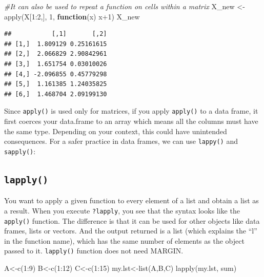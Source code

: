 \documentclass[
]{book}
\newenvironment{Shaded}{\begin{snugshade}}{\end{snugshade}}
\newcommand{\CommentTok}[1]{\textcolor[rgb]{0.56,0.35,0.01}{\textit{#1}}}
\newcommand{\ControlFlowTok}[1]{\textcolor[rgb]{0.13,0.29,0.53}{\textbf{#1}}}
\newcommand{\DecValTok}[1]{\textcolor[rgb]{0.00,0.00,0.81}{#1}}
\newcommand{\FunctionTok}[1]{\textcolor[rgb]{0.00,0.00,0.00}{#1}}
\newcommand{\NormalTok}[1]{#1}
\newcommand{\OtherTok}[1]{\textcolor[rgb]{0.56,0.35,0.01}{#1}}
\newcommand{\SpecialCharTok}[1]{\textcolor[rgb]{0.00,0.00,0.00}{#1}}
\begin{document}
\begin{Shaded}
\begin{Highlighting}[]
\CommentTok{\#It can also be used to repeat a function on cells within a matrix}
\NormalTok{X\_new }\OtherTok{\textless{}{-}} \FunctionTok{apply}\NormalTok{(X[}\DecValTok{1}\SpecialCharTok{:}\DecValTok{2}\NormalTok{,], }\DecValTok{1}\NormalTok{, }\ControlFlowTok{function}\NormalTok{(x) x}\SpecialCharTok{+}\DecValTok{1}\NormalTok{)}
\NormalTok{X\_new}
\end{Highlighting}
\end{Shaded}

\begin{verbatim}
##           [,1]       [,2]
## [1,]  1.809129 0.25161615
## [2,]  2.066829 2.90842961
## [3,]  1.651754 0.03010026
## [4,] -2.096855 0.45779298
## [5,]  1.161385 1.24035825
## [6,]  1.468704 2.09199130
\end{verbatim}

Since \texttt{apply()} is used only for matrices, if you apply \texttt{apply()} to a data frame, it first coerces your data.frame to an array which means all the columns must have the same type. Depending on your context, this could have unintended consequences. For a safer practice in data frames, we can use \texttt{lappy()} and \texttt{sapply()}:

\hypertarget{lapply}{%
\subsection{\texorpdfstring{\texttt{lapply()}}{lapply()}}\label{lapply}}

You want to apply a given function to every element of a list and obtain a list as a result. When you execute \texttt{?lapply}, you see that the syntax looks like the \texttt{apply()} function. The difference is that it can be used for other objects like data frames, lists or vectors. And the output returned is a list (which explains the ``l'' in the function name), which has the same number of elements as the object passed to it. \texttt{lapply()} function does not need MARGIN.

\begin{Shaded}
\begin{Highlighting}[]
\NormalTok{A}\OtherTok{\textless{}{-}}\FunctionTok{c}\NormalTok{(}\DecValTok{1}\SpecialCharTok{:}\DecValTok{9}\NormalTok{)}
\NormalTok{B}\OtherTok{\textless{}{-}}\FunctionTok{c}\NormalTok{(}\DecValTok{1}\SpecialCharTok{:}\DecValTok{12}\NormalTok{)}
\NormalTok{C}\OtherTok{\textless{}{-}}\FunctionTok{c}\NormalTok{(}\DecValTok{1}\SpecialCharTok{:}\DecValTok{15}\NormalTok{)}
\NormalTok{my.lst}\OtherTok{\textless{}{-}}\FunctionTok{list}\NormalTok{(A,B,C)}
\FunctionTok{lapply}\NormalTok{(my.lst, sum)}
\end{Highlighting}
\end{Shaded}
\end{document}
